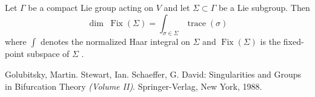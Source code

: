 \documentclass[12pt]{article}
\begin{document}
Let $\Gamma$ be a compact Lie group acting on $V$ and let $\Sigma \subset \Gamma$ be a Lie subgroup.  Then $$\operatorname{dim}\;\operatorname{Fix}(\Sigma) = \int_{\sigma\in\Sigma} \operatorname{trace}(\sigma)$$
where $\int$ denotes the normalized Haar integral on $\Sigma$ and $\operatorname{Fix}(\Sigma)$ is the fixed-point subspace of $\Sigma$ .

\begin{thebibliography}{1}
 Golubitsky, Martin. Stewart, Ian. Schaeffer, G. David: Singularities and Groups in Bifurcation Theory \textit{(Volume II)}. Springer-Verlag, New York, 1988.
\end{thebibliography}
\end{document}
